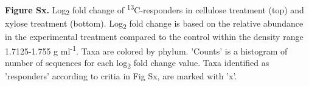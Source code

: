 \textbf{Figure Sx.}  Log\textsubscript{2} fold change of \textsuperscript{13}C-responders in cellulose treatment (top) and xylose treatment (bottom).  Log\textsubscript{2} fold change is based on the relative abundance in the experimental treatment compared to the control within the density range 1.7125-1.755 g ml\textsuperscript{-1}. Taxa are colored by phylum. 'Counts' is a histogram of number of sequences for each log\textsubscript{2} fold change value. Taxa identified as 'responders' according to critia in Fig Sx, are marked with 'x'. 